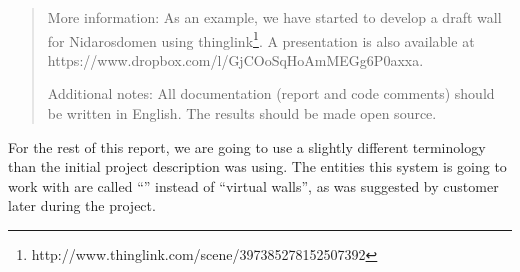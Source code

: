 \documentclass[11pt]{book}
\begin{document}
\begin{quotation}
More information: As an example, we have started to develop a draft wall for Nidarosdomen using thinglink\footnote{http://www.thinglink.com/scene/397385278152507392}. A presentation is also available at https://www.dropbox.com/l/GjCOoSqHoAmMEGg6P0axxa.

Additional notes: All documentation (report and code comments) should be written in English. The results should be made open source.\cite[p. 47]{compendium}
\end{quotation}

For the rest of this report, we are going to use a slightly different terminology than the initial project description was using. The entities this system is going to work with are called ``\wallentityp'' instead of ``virtual walls'', as was suggested by customer later during the project.
\end{document}
